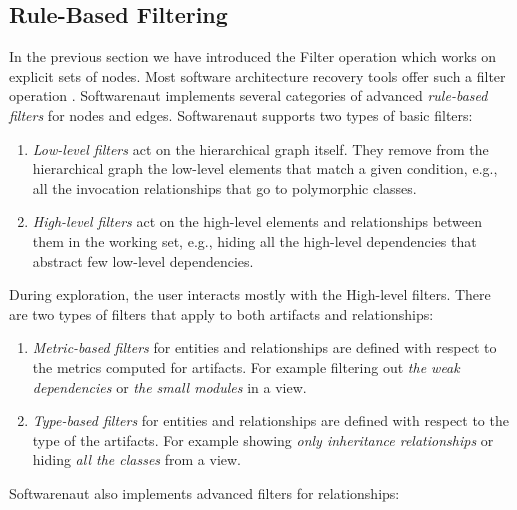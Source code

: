 \documentclass[preprint,12pt]{elsarticle}
\begin{document}
\newpage
\subsection {Rule-Based Filtering}

In the previous section we have introduced the Filter operation which works on explicit sets of nodes. Most software architecture recovery tools offer such a filter operation \cite{aracic-filtering}. Softwarenaut implements several categories of advanced {\em rule-based filters} for nodes and edges. Softwarenaut supports two types of basic filters: 

\begin{enumerate}

\item {\em Low-level filters} act on the hierarchical graph itself. They remove from the hierarchical graph the low-level elements that match a given condition, e.g., all the invocation relationships that go to polymorphic classes.

\item {\em High-level filters} act on the high-level elements and relationships between them in the working set, e.g., hiding all the high-level dependencies that abstract few low-level dependencies.

\end{enumerate}

During exploration, the user interacts mostly with the High-level filters. There are two types of filters that apply to both artifacts and relationships: 

\begin{enumerate}
\item {\em Metric-based filters} for entities and relationships are defined with respect to the metrics computed for artifacts. For example filtering out {\em the weak dependencies} or {\em the small modules} in a view.
\item {\em Type-based filters} for entities and relationships are defined with respect to the type of the artifacts. For example showing {\em only inheritance relationships} or hiding {\em all the classes} from a view.
\end{enumerate}

Softwarenaut also implements advanced filters for relationships:
\end{document}
